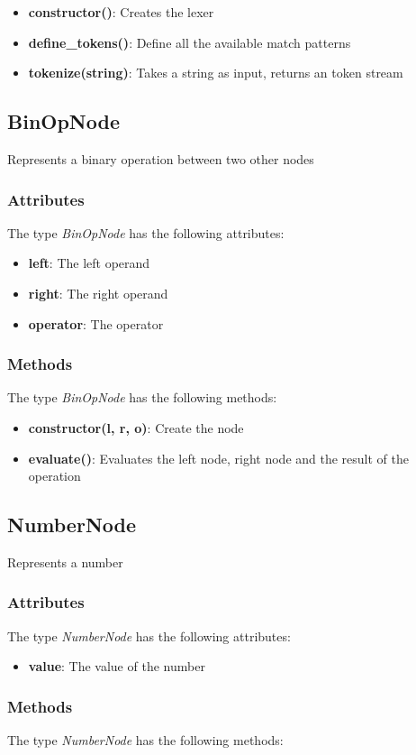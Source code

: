 \documentclass{article}
\begin{document}
\begin{itemize}\item {\bf constructor()}:  Creates the lexer 
\item {\bf define\_tokens()}:  Define all the available match patterns 
\item {\bf tokenize(string)}:  Takes a string as input, returns an token stream 
\end{itemize}\subsection{BinOpNode}
 Represents a binary operation between two other nodes \subsubsection*{Attributes}
The type {\it BinOpNode} has the following attributes:

\begin{itemize}
\item {\bf left}:  The left operand 
\item {\bf right}:  The right operand 
\item {\bf operator}:  The operator 
\end{itemize}
\subsubsection*{Methods}
The type {\it BinOpNode} has the following methods:

\begin{itemize}\item {\bf constructor(l, r, o)}:  Create the node 
\item {\bf evaluate()}:  Evaluates the left node, right node and the result of the operation 
\end{itemize}\subsection{NumberNode}
 Represents a number \subsubsection*{Attributes}
The type {\it NumberNode} has the following attributes:

\begin{itemize}
\item {\bf value}:  The value of the number 
\end{itemize}
\subsubsection*{Methods}
The type {\it NumberNode} has the following methods:
\end{document}
